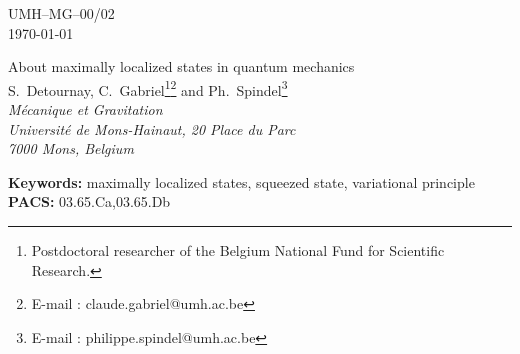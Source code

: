\documentclass[a4paper,10pt]{article}
\begin{document}
\begin{flushright} UMH--MG--00/02 \\\today\\ \end{flushright}
\vspace{.1cm}
\begin{center} {\large About maximally localized states in quantum mechanics}\\
\vspace{.5cm} S.~Detournay, C.~Gabriel\footnote{Postdoctoral
researcher of the Belgium National Fund for Scientific
Research.}\myHighlight{$^,$}\coordHE{}\footnote{ E-mail : claude.gabriel@umh.ac.be} and
Ph.~Spindel\footnote{ E-mail :
philippe.spindel@umh.ac.be}\\
\vspace{.2cm} {\it M\'ecanique et Gravitation}\\ {\it Universit\'e
de Mons-Hainaut, 20 Place du Parc}\\ {\it 7000 Mons, Belgium}\\
\end{center} \vspace{.1cm}



\begin{abstract}
We analyze the emergence of a minimal length for a large class of
generalized commutation relations, preserving commutation of the
position operators and translation invariance as well as rotation
invariance (in dimension higher than one). We show that the
construction of the maximally localized states based on squeezed
states generally fails. Rather, one must resort to a constrained
variational principle.
\end{abstract}
{\small {\bf Keywords: }{maximally localized states, squeezed
state,
variational principle}\\
{\bf PACS: }{03.65.Ca,03.65.Db}}
\end{document}
